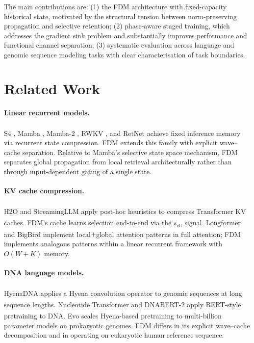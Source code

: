 \documentclass{article}
\newcommand{\citenum}[1]{%
  \textsuperscript{\rmfamily\upshape[#1]}}
\begin{document}
The main contributions are:
(1) the FDM architecture with fixed-capacity historical state, motivated by
the structural tension between norm-preserving propagation and selective
retention;
(2) phase-aware staged training, which addresses the gradient sink problem
and substantially improves performance and functional channel separation;
(3) systematic evaluation across language and genomic sequence modeling
tasks with clear characterisation of task boundaries.

\section{Related Work}

\paragraph{Linear recurrent models.}
S4\citenum{4}, Mamba\citenum{5}, Mamba-2\citenum{7}, RWKV\citenum{6},
and RetNet\citenum{8} achieve fixed inference memory via recurrent state
compression.
FDM extends this family with explicit wave--cache separation.
Relative to Mamba's selective state space mechanism, FDM separates global
propagation from local retrieval architecturally rather than through
input-dependent gating of a single state.

\paragraph{KV cache compression.}
H2O\citenum{9} and StreamingLLM\citenum{10} apply post-hoc heuristics
to compress Transformer KV caches.
FDM's cache learns selection end-to-end via the $s_\mathrm{eff}$ signal.
Longformer\citenum{11} and BigBird\citenum{12} implement
local$+$global attention patterns in full attention; FDM implements
analogous patterns within a linear recurrent framework with
$O(W{+}K)$ memory.

\paragraph{DNA language models.}
HyenaDNA\citenum{2} applies a Hyena convolution operator to genomic
sequences at long sequence lengths.
Nucleotide Transformer\citenum{13} and DNABERT-2\citenum{14} apply
BERT-style pretraining to DNA.
Evo\citenum{15} scales Hyena-based pretraining to multi-billion parameter
models on prokaryotic genomes.
FDM differs in its explicit wave--cache decomposition and in operating on
eukaryotic human reference sequence.
\end{document}

